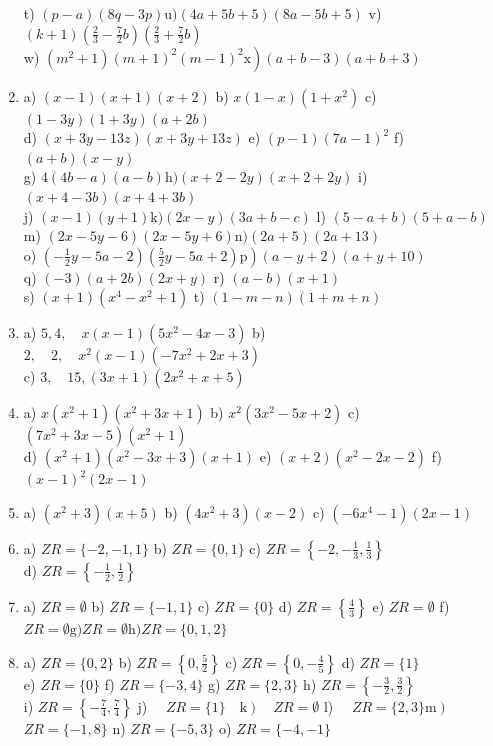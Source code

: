 \documentclass[10pt]{article}
\begin{document}
\begin{enumerate}
t) \((p-a)(8 q-3 p) \mathrm{u})(4 a+5 b+5)(8 a-5 b+5)\) v) \((k+1)\left(\frac{2}{3}-\frac{7}{2} b\right)\left(\frac{2}{3}+\frac{7}{2} b\right)\)\\
w) \(\left.\left(m^{2}+1\right)(m+1)^{2}(m-1)^{2} \mathrm{x}\right)(a+b-3)(a+b+3)\)
  \item a) \((x-1)(x+1)(x+2)\) b) \(x(1-x)\left(1+x^{2}\right)\) c) \((1-3 y)(1+3 y)(a+2 b)\)\\
d) \((x+3 y-13 z)(x+3 y+13 z)\) e) \((p-1)(7 a-1)^{2}\) f) \((a+b)(x-y)\)\\
g) \(4(4 b-a)(a-b) \mathrm{h})(x+2-2 y)(x+2+2 y)\) i) \((x+4-3 b)(x+4+3 b)\)\\
j) \((x-1)(y+1) \mathrm{k})(2 x-y)(3 a+b-c)\) l) \((5-a+b)(5+a-b)\)\\
m) \((2 x-5 y-6)(2 x-5 y+6) \mathrm{n})(2 a+5)(2 a+13)\)\\
o) \(\left.\left(-\frac{1}{2} y-5 a-2\right)\left(\frac{5}{2} y-5 a+2\right) \mathrm{p}\right)(a-y+2)(a+y+10)\)\\
q) \((-3)(a+2 b)(2 x+y)\) r) \((a-b)(x+1)\)\\
s) \((x+1)\left(x^{4}-x^{2}+1\right)\) t) \((1-m-n)(1+m+n)\)
  \item a) \(5,4, \quad x(x-1)\left(5 x^{2}-4 x-3\right)\) b) \(2, \quad 2, \quad x^{2}(x-1)\left(-7 x^{2}+2 x+3\right)\)\\
c) \(3, \quad 15,(3 x+1)\left(2 x^{2}+x+5\right)\)
  \item a) \(x\left(x^{2}+1\right)\left(x^{2}+3 x+1\right)\) b) \(x^{2}\left(3 x^{2}-5 x+2\right)\) c) \(\left(7 x^{2}+3 x-5\right)\left(x^{2}+1\right)\)\\
d) \(\left(x^{2}+1\right)\left(x^{2}-3 x+3\right)(x+1)\) e) \((x+2)\left(x^{2}-2 x-2\right)\) f) \((x-1)^{2}(2 x-1)\)
  \item a) \(\left(x^{2}+3\right)(x+5)\) b) \(\left(4 x^{2}+3\right)(x-2)\) c) \(\left(-6 x^{4}-1\right)(2 x-1)\)
  \item a) \(Z R=\{-2,-1,1\}\) b) \(Z R=\{0,1\}\) c) \(Z R=\left\{-2,-\frac{1}{3}, \frac{1}{3}\right\}\)\\
d) \(Z R=\left\{-\frac{1}{2}, \frac{1}{2}\right\}\)
  \item a) \(Z R=\emptyset\) b) \(Z R=\{-1,1\}\) c) \(Z R=\{0\}\) d) \(Z R=\left\{\frac{4}{3}\right\}\) e) \(Z R=\emptyset\) f) \(Z R=\emptyset \mathrm{g}) Z R=\emptyset \mathrm{h}) Z R=\{0,1,2\}\)
  \item a) \(Z R=\{0,2\}\) b) \(Z R=\left\{0, \frac{5}{2}\right\}\) c) \(Z R=\left\{0,-\frac{4}{5}\right\}\) d) \(Z R=\{1\}\)\\
e) \(Z R=\{0\}\) f) \(Z R=\{-3,4\}\) g) \(Z R=\{2,3\}\) h) \(Z R=\left\{-\frac{3}{2}, \frac{3}{2}\right\}\)\\
i) \(Z R=\left\{-\frac{7}{4}, \frac{7}{4}\right\}\) j) \(\left.\quad Z R=\{1\} \quad \mathrm{k}\right) \quad Z R=\emptyset\) l) \(\left.\quad Z R=\{2,3\} \mathrm{m}\right)\) \(Z R=\{-1,8\}\) n) \(Z R=\{-5,3\}\) o) \(Z R=\{-4,-1\}\)
\end{enumerate}
\end{document}
